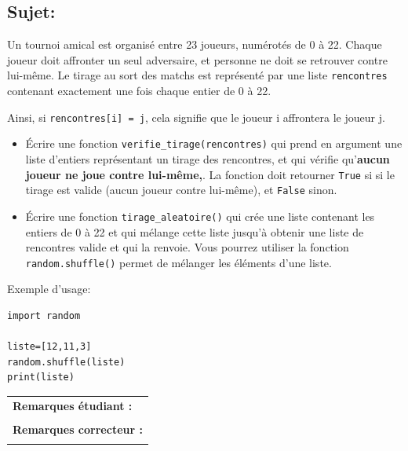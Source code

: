 \documentclass[a4paper,11pt]{article}
\begin{document}
\subsection*{Sujet:}

Un tournoi amical est organisé entre 23 joueurs, numérotés de 0 à 22.
Chaque joueur doit affronter un seul adversaire, et personne ne doit se retrouver contre lui-même.
Le tirage au sort des matchs est représenté par une liste \texttt{rencontres} contenant exactement une fois chaque entier de 0 à 22.

Ainsi, si \texttt{rencontres[i] = j}, cela signifie que le joueur i affrontera le joueur j.

\begin{itemize}
\item[1.]  Écrire une fonction \texttt{verifie\_tirage(rencontres)} qui prend en argument une liste d’entiers représentant un tirage des rencontres, et qui vérifie qu’\textbf{aucun joueur ne joue contre lui-même,}.  La fonction doit retourner \texttt{True} si si le tirage est valide (aucun joueur contre lui-même), et \texttt{False} sinon.
\item[2.] Écrire une fonction \texttt{tirage\_aleatoire()} qui crée une liste contenant les entiers de 0 à 22 et qui mélange cette liste jusqu'à obtenir une liste de rencontres valide et qui la renvoie. Vous pourrez utiliser la fonction \texttt{random.shuffle()} permet de mélanger les éléments d'une liste.
\end{itemize}

\vspace*{-0.3 cm}
Exemple d'usage: 
\begin{verbatim}
import random

liste=[12,11,3]
random.shuffle(liste)
print(liste)
\end{verbatim}


\begin{table}[h!]
\centering
\renewcommand{\arraystretch}{1.4} %
\begin{tabular}{|p{15cm}|}
\hline
\textbf{Remarques étudiant :}    \\
 \\
\hline
\textbf{Remarques correcteur :}  \\
 \\
\hline
\end{tabular}
\end{table}
\end{document}
